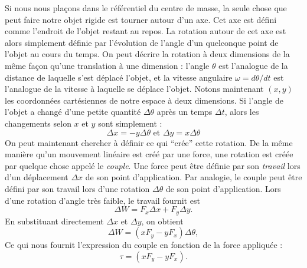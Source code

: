 Si nous nous plaçons dans le référentiel du centre de masse, la seule chose que peut faire notre objet rigide est tourner autour d'un axe. Cet axe est défini comme l'endroit de l'objet restant au repos. La rotation autour de cet axe est alors simplement définie par l'évolution de l'angle d'un quelconque point de l'objet au cours du temps. On peut décrire la rotation à deux dimensions de la même façon qu'une translation à une dimension : l'angle $\theta$ est l'analogue de la distance de laquelle s'est déplacé l'objet, et la vitesse angulaire $\omega=d\theta/dt$ est l'analogue de la vitesse à laquelle se déplace l'objet. Notons maintenant $(x,y)$ les coordonnées cartésiennes de notre espace à deux dimensions. Si l'angle de l'objet a changé d'une petite quantité $\Delta\theta$ après un temps $\Delta t$, alors les changements selon $x$ et $y$ sont simplement :
\begin{equation*}
\Delta x = -y\Delta \theta \mbox{ et } \Delta y = x\Delta \theta
\end{equation*}
On peut maintenant chercher à définir ce qui ``crée'' cette rotation. De la même manière qu'un mouvement linéaire est créé par une force, une rotation est créée par quelque chose appelé le \textit{couple}. Une force peut être définie par son \textit{travail} lors d'un déplacement $\Delta x$ de son point d'application. Par analogie, le couple peut être défini par son travail lors d'une rotation $\Delta \theta$ de son point d'application. Lors d'une rotation d'angle très faible, le travail fournit est 
\begin{equation*}
\Delta W = F_x \Delta x + F_y \Delta y.
\end{equation*}
En substituant directement $\Delta x$ et $\Delta y$, on obtient
\begin{equation*}
\Delta W = (xF_y-yF_x)\Delta \theta,
\end{equation*}
Ce qui nous fournit l'expression du couple en fonction de la force appliquée :
\begin{equation*}
\tau = (xF_y-yF_x).
\end{equation*}

